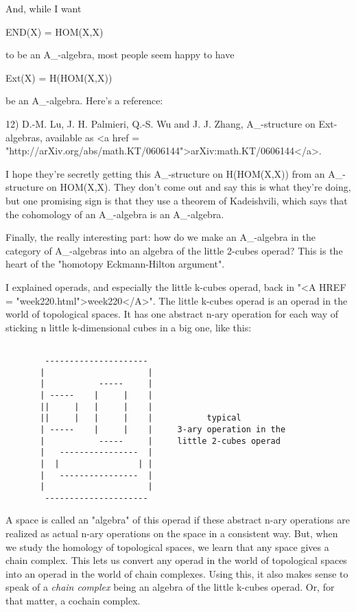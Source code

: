 And, while I want 

END(X) = HOM(X,X) 

to be an A_{\infty }-algebra, most people seem happy to have

Ext(X) = H(HOM(X,X))

be an A_{\infty }-algebra.  Here's a reference:

12) D.-M. Lu, J. H. Palmieri, Q.-S. Wu and J. J. Zhang,
A_{\infty }-structure on Ext-algebras, available as 
<a href = "http://arXiv.org/abs/math.KT/0606144">arXiv:math.KT/0606144</a>.

I hope they're secretly getting this A_{\infty }-structure on 
H(HOM(X,X)) from an A_{\infty }-structure on HOM(X,X).  They don't
come out and say this is what they're doing, but one promising 
sign is that they use a theorem of Kadeishvili, which says that 
the cohomology of an A_{\infty }-algebra is an A_{\infty }-algebra.  

Finally, the really interesting part: how do we make an
A_{\infty }-algebra in the category of
A_{\infty }-algebras into an algebra of the little 2-cubes
operad?  This is the heart of the "homotopy Eckmann-Hilton argument".

I explained operads, and especially the little k-cubes operad, back in
"<A HREF = "week220.html">week220</A>".  The little k-cubes
operad is an operad in the world of topological spaces.  It has one
abstract n-ary operation for each way of sticking n little
k-dimensional cubes in a big one, like this:


\begin{verbatim}

        ---------------------
       |                     |
       |           -----     |
       | -----    |     |    | 
       ||     |   |     |    |
       ||     |   |     |    |           typical  
       | -----    |     |    |     3-ary operation in the       
       |           -----     |     little 2-cubes operad
       |   ----------------  |
       |  |                | |
       |   ----------------  |
       |                     |
        ---------------------
\end{verbatim}
    

A space is called an "algebra" of this operad if these abstract 
n-ary operations are realized as actual n-ary operations on the 
space in a consistent way.  But, when we study the homology 
of topological spaces, we learn that any space gives a chain complex.
This lets us convert any operad in the world of topological spaces 
into an operad in the world of chain complexes.  Using this, it also 
makes sense to speak of a \emph{chain complex} being an algebra of the
little k-cubes operad.  Or, for that matter, a cochain complex.

